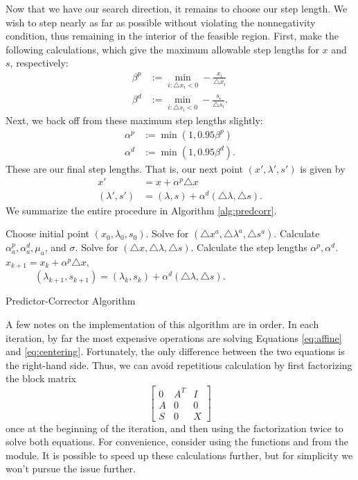 Now that we have our search direction, it remains to choose our step length.
We wish to step nearly as far as possible without violating the nonnegativity condition, thus remaining in the interior of the feasible region.
First, make the following calculations, which give the maximum allowable step lengths for $x$ and $s$, respectively:
\begin{align*}
\beta^p &:= \displaystyle\min_{i : \triangle x_i < 0}-\frac{x_i}{\triangle x_i}\\
\beta^d &:= \displaystyle\min_{i : \triangle s_i < 0}-\frac{s_i}{\triangle s_i}.
\end{align*}
Next, we back off from these maximum step lengths slightly:
\begin{align*}
\alpha^p &:= \min(1, 0.95\beta^p)\\
\alpha^d &:= \min(1, 0.95\beta^d).
\end{align*}
These are our final step lengths.
That is, our next point $(x', \lambda', s')$ is given by
\begin{align*}
x' &= x + \alpha^p\triangle x\\
(\lambda', s') &= (\lambda, s) + \alpha^d(\triangle \lambda, \triangle s).
\end{align*}
We summarize the entire procedure in Algorithm \ref{alg:predcorr}.
\begin{algorithm}
\begin{algorithmic}[1]
    \State \textrm{Choose initial point } $(x_0, \lambda_0, s_0)$.
        \State \textrm{Solve for } $(\triangle x^a, \triangle \lambda^a, \triangle s^a)$.
        \State \textrm{Calculate } $\alpha_a^p, \alpha_a^d, \mu_a$, \textrm{and} $\sigma$.
        \State \textrm{Solve for } $(\triangle x, \triangle \lambda, \triangle s)$.
        \State \textrm{Calculate the step lengths } $\alpha^p, \alpha^d$.
        \State $x_{k+1} = x_k + \alpha^p\triangle x$,\\
        $\qquad\quad(\lambda_{k+1}, s_{k+1}) = (\lambda_k, s_k) + \alpha^d(\triangle \lambda, \triangle s)$.
    \EndFor
\EndProcedure
\end{algorithmic}
\caption{Predictor-Corrector Algorithm}
\label{alg:predcorr}
\end{algorithm}

A few notes on the implementation of this algorithm are in order.
In each iteration, by far the most expensive operations are solving Equations \ref{eq:affine} and \ref{eq:centering}.
Fortunately, the only difference between the two equations is the right-hand side.
Thus, we can avoid repetitious calculation by first factorizing the block matrix
\[
\begin{bmatrix}
0 & A^T & I\\
A & 0 & 0\\
S & 0 & X
\end{bmatrix}
\]
once at the beginning of the iteration, and then using the factorization twice to solve both equations.
For convenience, consider using the functions  and  from the  module.
It is possible to speed up these calculations further, but for simplicity we won't pursue the issue further.

